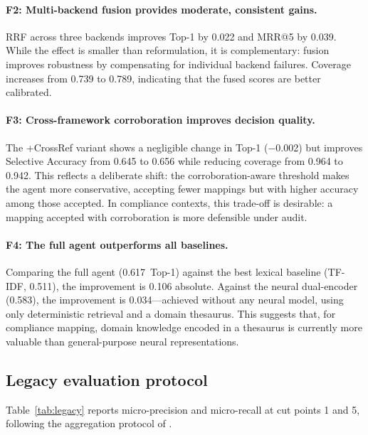 \documentclass[a4paper,fleqn]{cas-sc}
\begin{document}
\paragraph{F2: Multi-backend fusion provides moderate, consistent gains.}
RRF across three backends improves Top-1 by 0.022 and MRR@5 by 0.039.
While the effect is smaller than reformulation, it is complementary: fusion improves robustness by compensating for individual backend failures.
Coverage increases from 0.739 to 0.789, indicating that the fused scores are better calibrated.

\paragraph{F3: Cross-framework corroboration improves decision quality.}
The +CrossRef variant shows a negligible change in Top-1 ($-$0.002) but improves Selective Accuracy from 0.645 to 0.656 while reducing coverage from 0.964 to 0.942.
This reflects a deliberate shift: the corroboration-aware threshold makes the agent more conservative, accepting fewer mappings but with higher accuracy among those accepted.
In compliance contexts, this trade-off is desirable: a mapping accepted with corroboration is more defensible under audit.

\paragraph{F4: The full agent outperforms all baselines.}
Comparing the full agent (0.617~Top-1) against the best lexical baseline (TF-IDF, 0.511), the improvement is 0.106 absolute.
Against the neural dual-encoder (0.583), the improvement is 0.034---achieved without any neural model, using only deterministic retrieval and a domain thesaurus.
This suggests that, for compliance mapping, domain knowledge encoded in a thesaurus is currently more valuable than general-purpose neural representations.


\subsection{Legacy evaluation protocol}

Table~\ref{tab:legacy} reports micro-precision and micro-recall at cut points 1 and 5, following the aggregation protocol of \citet{MarcusMaletic2003}.
\end{document}
